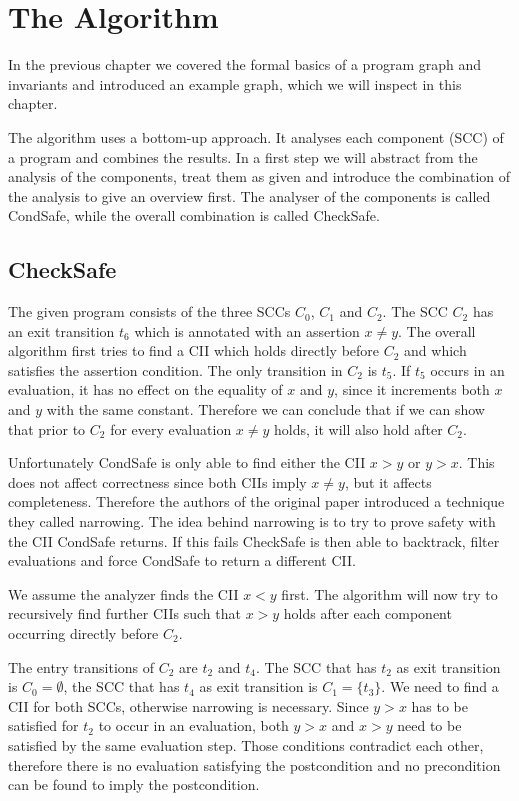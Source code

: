 \section{The Algorithm}
\label{sec:topic}

In the previous chapter we covered the formal basics of a program graph and invariants and introduced an example graph, which we will inspect in this chapter.

The algorithm uses a bottom-up approach. It analyses each component (SCC) of a program and combines the results.
In a first step we will abstract from the analysis of the components, treat them as given and introduce the combination of the analysis to give an overview first.
The analyser of the components is called CondSafe, while the overall combination is called CheckSafe.

\subsection{CheckSafe}

The given program consists of the three SCCs $C_0$, $C_1$ and $C_2$.
The SCC $C_2$ has an exit transition $t_6$ which is annotated with an assertion $x \neq y$.
The overall algorithm first tries to find a CII which holds directly before $C_2$ and which satisfies the assertion condition.
The only transition in $C_2$ is $t_5$. If $t_5$ occurs in an evaluation, it has no effect on the equality of $x$ and $y$, since it increments both $x$ and $y$ with the same constant.
Therefore we can conclude that if we can show that prior to $C_2$ for every evaluation $x \neq y$ holds, it will also hold after $C_2$.

Unfortunately CondSafe is only able to find either the CII $x > y$ or $y > x$. This does not affect correctness since both CIIs imply $x \neq y$, but it affects completeness.
Therefore the authors of the original paper introduced a technique they called narrowing.
The idea behind narrowing is to try to prove safety with the CII CondSafe returns.
If this fails CheckSafe is then able to backtrack, filter evaluations and force CondSafe to return a different CII.

We assume the analyzer finds the CII $x < y$ first.
The algorithm will now try to recursively find further CIIs such that $x > y$ holds after each component occurring directly before $C_2$.

The entry transitions of $C_2$ are $t_2$ and $t_4$.
The SCC that has $t_2$ as exit transition is $C_0 = \emptyset$, the SCC that has $t_4$ as exit transition is $C_1 = \lbrace t_3 \rbrace$.
We need to find a CII for both SCCs, otherwise narrowing is necessary.
Since $y > x$ has to be satisfied for $t_2$ to occur in an evaluation, both $y > x$ and $x > y$ need to be satisfied by the same evaluation step.
Those conditions contradict each other, therefore there is no evaluation satisfying the postcondition and no precondition can be found to imply the postcondition.

